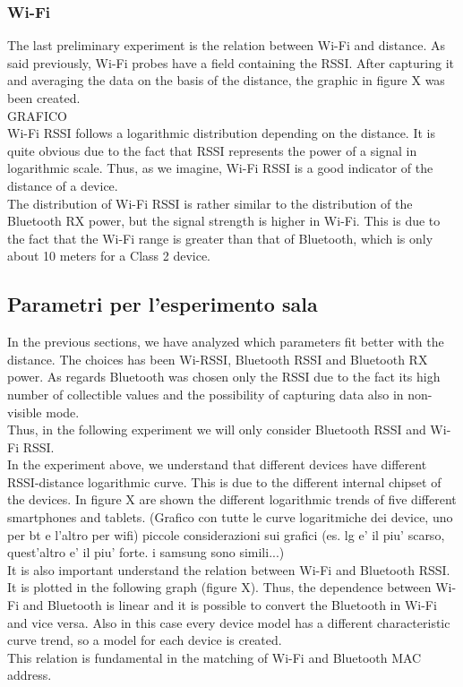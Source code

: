 \subsubsection{Wi-Fi}
The last preliminary experiment is the relation between Wi-Fi and distance. As said previously, Wi-Fi probes have a field containing the RSSI. After capturing it and averaging the data on the basis of the distance, the graphic in figure X was been created.\\GRAFICO\\
Wi-Fi RSSI follows a logarithmic distribution depending on the distance. It is quite obvious due to the fact that RSSI represents the power of a signal in logarithmic scale. Thus, as we imagine, Wi-Fi RSSI is a good indicator of the distance of a device.\\
The distribution of Wi-Fi RSSI is rather similar to the distribution of the Bluetooth RX power, but the signal strength is higher in Wi-Fi. This is due to the fact that the Wi-Fi range is greater than that of Bluetooth, which is only about 10 meters for a Class 2 device.


\subsection{Parametri per l'esperimento sala}
In the previous sections, we have analyzed which parameters fit better with the distance. The choices has been Wi-RSSI, Bluetooth RSSI and Bluetooth RX power. As regards Bluetooth was chosen only the RSSI due to the fact its high number of collectible values and the possibility of capturing data also in non-visible mode.\\
Thus, in the following experiment we will only consider Bluetooth RSSI and Wi-Fi RSSI.\\
In the experiment above, we understand that different devices have different RSSI-distance logarithmic curve. This is due to the different internal chipset of the devices. In figure X are shown the different logarithmic trends of five different smartphones and tablets. (Grafico con tutte le curve logaritmiche dei device, uno per bt e l'altro per wifi) piccole considerazioni sui grafici (es. lg e' il piu' scarso, quest'altro e' il piu' forte. i samsung sono simili...)\\
\linebreak
It is also important understand the relation between Wi-Fi and Bluetooth RSSI. It is plotted in the following graph (figure X). Thus, the dependence between Wi-Fi and Bluetooth is linear and it is possible to convert the Bluetooth in Wi-Fi and vice versa. Also in this case every device model has a different characteristic curve trend, so a model for each device is created.\\
This relation is fundamental in the matching of Wi-Fi and Bluetooth MAC address.
